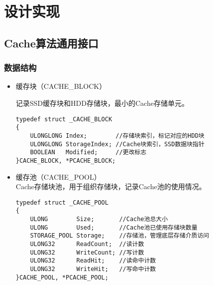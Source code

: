 
\chapter{设计实现}
\label{cha:mainmatter}

\section{Cache算法通用接口}
\label{sec:cache_interface}

\subsection{数据结构}
\begin{itemize}

\item 缓存块（CACHE\_BLOCK）

记录SSD缓存块和HDD存储块，最小的Cache存储单元。
\begin{lstlisting}
typedef struct _CACHE_BLOCK
{
    ULONGLONG Index;        //存储块索引，标记对应的HDD块
    ULONGLONG StorageIndex; //Cache块索引，SSD数据块指针
    BOOLEAN   Modified;     //更改标志
}CACHE_BLOCK, *PCACHE_BLOCK;
\end{lstlisting}

\item 缓存池（CACHE\_POOL）
\\Cache存储块池，用于组织存储块，记录Cache池的使用情况。
\begin{lstlisting}
typedef struct _CACHE_POOL
{
    ULONG        Size;       //Cache池总大小
    ULONG        Used;       //Cache池已使用存储块数量
    STORAGE_POOL Storage;    //存储池，管理底层存储介质访问
    ULONG32      ReadCount;  //读计数
    ULONG32      WriteCount; //写计数
    ULONG32      ReadHit;    //读命中计数
    ULONG32      WriteHit;   //写命中计数
}CACHE_POOL, *PCACHE_POOL;
\end{lstlisting}

\end{itemize}

